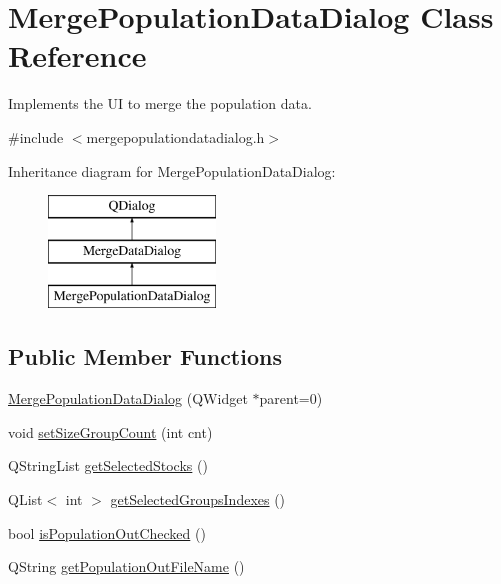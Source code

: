 \hypertarget{class_merge_population_data_dialog}{}\section{Merge\+Population\+Data\+Dialog Class Reference}
\label{class_merge_population_data_dialog}


Implements the UI to merge the population data.  




{\ttfamily \#include $<$mergepopulationdatadialog.\+h$>$}

Inheritance diagram for Merge\+Population\+Data\+Dialog\+:\begin{figure}[H]
\begin{center}
\leavevmode
\includegraphics[height=3.000000cm]{de/db2/class_merge_population_data_dialog}
\end{center}
\end{figure}
\subsection*{Public Member Functions}
\begin{DoxyCompactItemize}
\item 
\mbox{\hyperlink{class_merge_population_data_dialog_a3b1200cfc75b281cabcdd15166ae454c}{Merge\+Population\+Data\+Dialog}} (Q\+Widget $\ast$parent=0)
\item 
void \mbox{\hyperlink{class_merge_population_data_dialog_ad031b471bd7e250c7b2e1b05ef064612}{set\+Size\+Group\+Count}} (int cnt)
\item 
Q\+String\+List \mbox{\hyperlink{class_merge_population_data_dialog_a71b7f9249eb6f6400ee40252e5aad311}{get\+Selected\+Stocks}} ()
\item 
Q\+List$<$ int $>$ \mbox{\hyperlink{class_merge_population_data_dialog_a23c6c9cc1c02e673577ca204a5780170}{get\+Selected\+Groups\+Indexes}} ()
\item 
bool \mbox{\hyperlink{class_merge_population_data_dialog_a2a561b1c807d4dd51df7ffd785efa735}{is\+Population\+Out\+Checked}} ()
\item 
Q\+String \mbox{\hyperlink{class_merge_population_data_dialog_a08f0ffc8dd5ee72fc6cd0ac32047d767}{get\+Population\+Out\+File\+Name}} ()
\end{DoxyCompactItemize}
